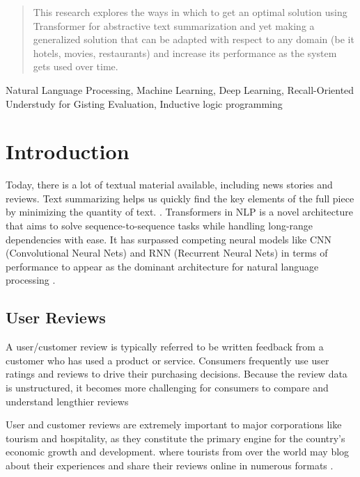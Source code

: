 \documentclass[conference]{IEEEtran}
\begin{document}
\begin{abstract}
This research explores the ways in which to get an optimal solution using Transformer for abstractive text summarization and yet making a generalized solution that can be adapted with respect to any domain (be it hotels, movies, restaurants) and increase its performance as the system gets used over time.
\end{abstract}

\begin{IEEEkeywords}
Natural Language Processing, Machine Learning, Deep Learning, Recall-Oriented Understudy for Gisting Evaluation, Inductive logic programming
\end{IEEEkeywords}

\section{Introduction}
Today, there is a lot of textual material available, including news stories and reviews. Text summarizing helps us quickly find the key elements of the full piece by minimizing the quantity of text. \cite{etemad_abidi_chhabra_2021}. Transformers in NLP is a novel architecture that aims to solve sequence-to-sequence tasks while handling long-range dependencies with ease. It has surpassed competing neural models like CNN (Convolutional Neural Nets) and RNN (Recurrent Neural Nets) in terms of performance to appear as the dominant architecture for natural language processing \cite{wolf__2020}.

\subsection{User Reviews}
A user/customer review is typically referred to be written feedback from a customer who has used a product or service. Consumers frequently use user ratings and reviews to drive their purchasing decisions. Because the review data is unstructured, it becomes more challenging for consumers to compare and understand lengthier reviews \cite{mcauley_leskovec_2013}

User and customer reviews are extremely important to major corporations like tourism and hospitality, as they constitute the primary engine for the country's economic growth and development. where tourists from over the world may blog about their experiences and share their reviews online in numerous formats \cite{mukherjee_peruri_vishnu_goyal_bhattacharya_ganguly_2020}. 
\end{document}
